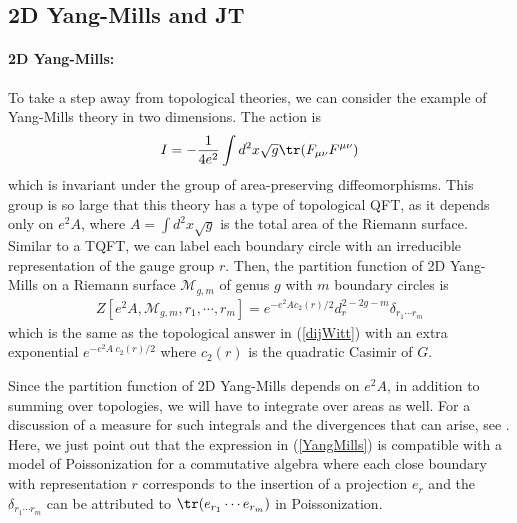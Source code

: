 \documentclass[a4paper,11pt]{article}
\theoremstyle{definition}
\numberwithin{equation}{section}
\newcommand{\mM}{\mathcal{M}}
\begin{document}
\subsection{2D Yang-Mills and JT}\label{subsec:otherexamples}

\paragraph{2D Yang-Mills:} To take a step away from topological theories, we can consider the example of  Yang-Mills theory in two dimensions. The action is 
\begin{eqnarray}
    I=-\frac{1}{4e^2}\int d^2x \sqrt{g} \tr(F_{\mu\nu}F^{\mu\nu})
\end{eqnarray}
which is invariant under the group of area-preserving diffeomorphisms. This group is so large that this theory has a type of topological QFT, as it depends only on $e^2A$, where $A=\int d^2x\sqrt{g}$ is the total area of the Riemann surface. Similar to a TQFT, we can label each boundary circle with an irreducible representation of the gauge group $r$. Then, the partition function of 2D Yang-Mills on a Riemann surface $\mM_{g,m}$ of genus $g$ with $m$ boundary circles is \cite{witten1991quantum}
\begin{eqnarray}\label{YangMills}
    Z[e^2A, \mM_{g,m},r_1,\cdots, r_m]=e^{-e^2A c_2(r)/2}d_r^{2-2g-m}\delta_{r_1\cdots r_m}
\end{eqnarray}
which is the same as the topological answer in (\ref{dijWitt}) with an extra exponential $e^{-e^2A\: c_2(r)/2}$ where $c_2(r)$ is the quadratic Casimir of $G$. 

Since the partition function of 2D Yang-Mills depends on $e^2A$, in addition to summing over topologies, we will have to integrate over areas as well. For a discussion of a measure for such integrals and the divergences that can arise, see \cite{Banerjee:2022szm}. Here, we just point out that the expression in (\ref{YangMills}) is compatible with a model of Poissonization for a commutative algebra where each close boundary with representation $r$ corresponds to the insertion of a projection $e_r$ and the $\delta_{r_1\cdots r_m}$ can be attributed to $\tr(e_{r_1}\cdots e_{r_m})$ in Poissonization.
\end{document}
